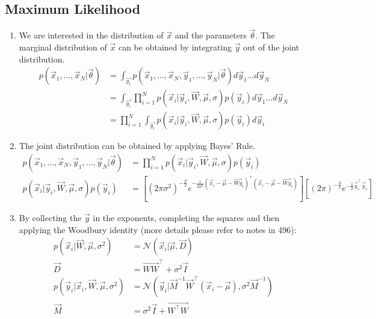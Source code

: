 \documentclass[12pt,twoside]{article}
\begin{document}
\subsection{Maximum Likelihood}
\begin{enumerate}
\item We are interested in the distribution of $\vec{x}$ and the parameters $\vec{\theta}$. The marginal distribution of $\vec{x}$ can be obtained by integrating $\vec{y}$ out of the joint distribution.
\begin{align*}
p(\vec{x}_1,\dots, \vec{x}_N \vert \vec{\theta})
&=\int_{\vec{y_i}}p(\vec{x}_1,\dots, \vec{x}_N, \vec{y}_1,\dots, \vec{y}_N \vert \vec{\theta}) d\vec{y}_1\dots d\vec{y}_N\\
&= \int_{\vec{y_i}}\prod_{i=1}^N p(\vec{x}_i \vert \vec{y}_i,\vec{W}, \vec{\mu}, \sigma)p(\vec{y}_i)d\vec{y}_1\dots d\vec{y}_N\\
&= \prod_{i=1}^N\int_{\vec{y_i}} p(\vec{x}_i \vert \vec{y}_i,\vec{W}, \vec{\mu}, \sigma)p(\vec{y}_i)d\vec{y}_i
\end{align*}

\item The joint distribution can be obtained by applying Bayes' Rule.
\begin{align*}
p(\vec{x}_1,\dots, \vec{x}_N, \vec{y}_1,\dots, \vec{y}_N \vert \vec{\theta})
& = \prod_{i=1}^N p(\vec{x}_i \vert \vec{y}_i,\vec{W}, \vec{\mu}, \sigma)p(\vec{y}_i)\\
p(\vec{x}_i \vert \vec{y}_i,\vec{W}, \vec{\mu}, \sigma)p(\vec{y}_i) 
&= \left[(2\pi\sigma^2)^{-\frac{F}{2}} e^{-\frac{1}{2\sigma^2}(\vec{x}_i-\vec{\mu}-\vec{Wy}_i)^\top(\vec{x}_i-\vec{\mu}-\vec{Wy}_i)}\right]\left[(2\pi)^{-\frac{d}{2}}e^{-\frac{1}{2}\vec{y}_i^\top\vec{y}_i}\right]
\end{align*}

\item By collecting the $\vec{y}$ in the exponents, completing the squares and then applying the Woodbury identity (more details please refer to notes in 496):
\begin{align*}
p(\vec{x}_i\vert \vec{W}, \vec{\mu}, \sigma^2) & = \mathcal{N}(\vec{x}_i\vert \vec{\mu}, \vec{D} )\\
\vec{D}&=\vec{WW}^\top +\sigma^2\vec{I}\\
p(\vec{y}_i\vert \vec{x}_i, \vec{W}, \vec{\mu}, \sigma^2) & = \mathcal{N}(\vec{y}_i \vert \vec{M}^{-1}\vec{W}^\top(\vec{x}_i-\vec{\mu}), \sigma^2\vec{M}^{-1})\\
\vec{M}&=\sigma^2\vec{I} + \vec{W^\top W}
\end{align*}


\end{enumerate}
\end{document}
